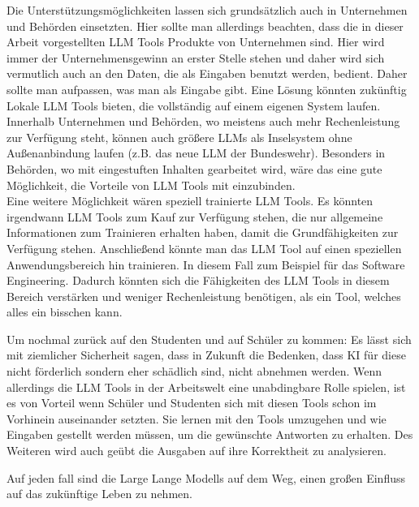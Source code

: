 Die Unterstützungsmöglichkeiten lassen sich grundsätzlich auch in Unternehmen und Behörden einsetzten. Hier sollte man 
allerdings beachten, dass die in dieser Arbeit vorgestellten LLM Tools Produkte von Unternehmen sind. Hier wird immer 
der Unternehmensgewinn an erster Stelle stehen und daher wird sich vermutlich auch an den Daten, die als Eingaben benutzt werden, 
bedient. Daher sollte man aufpassen, was man als Eingabe gibt. Eine Lösung könnten zukünftig Lokale LLM Tools bieten,
die vollständig auf einem eigenen System laufen. Innerhalb Unternehmen und Behörden, wo meistens auch mehr Rechenleistung 
zur Verfügung steht, können auch größere LLMs als Inselsystem ohne Außenanbindung laufen (z.B. das neue LLM der Bundeswehr). 
Besonders in Behörden, wo mit eingestuften Inhalten gearbeitet wird, wäre das eine gute Möglichkeit, die Vorteile 
von LLM Tools mit einzubinden.\\
Eine weitere Möglichkeit wären speziell trainierte LLM Tools. Es könnten irgendwann LLM Tools zum Kauf zur 
Verfügung stehen, die nur allgemeine Informationen zum Trainieren erhalten haben, damit die Grundfähigkeiten zur 
Verfügung stehen. Anschließend könnte man das LLM Tool auf einen speziellen Anwendungsbereich hin trainieren. In diesem 
Fall zum Beispiel für das Software Engineering. Dadurch könnten sich die Fähigkeiten des LLM Tools in diesem Bereich 
verstärken und weniger Rechenleistung benötigen, als ein Tool, welches alles ein bisschen kann.

Um nochmal zurück auf den Studenten und auf Schüler zu kommen: Es lässt sich mit ziemlicher Sicherheit sagen, 
dass in Zukunft die Bedenken, dass KI für diese nicht förderlich sondern eher schädlich sind, nicht abnehmen 
werden. Wenn allerdings die LLM Tools in der Arbeitswelt eine unabdingbare Rolle spielen, ist es von Vorteil 
wenn Schüler und Studenten sich mit diesen Tools schon im Vorhinein auseinander setzten. Sie lernen mit den Tools 
umzugehen und wie Eingaben gestellt werden müssen, um die gewünschte Antworten zu erhalten. Des Weiteren 
wird auch geübt die Ausgaben auf ihre Korrektheit zu analysieren.

Auf jeden fall sind die Large Lange Modells auf dem Weg, einen großen Einfluss auf das zukünftige Leben zu nehmen.